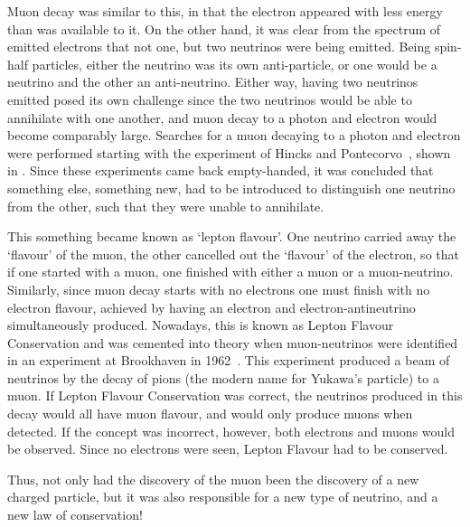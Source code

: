 
Muon decay was similar to this, in that the electron appeared with less energy than was available to it.
On the other hand, it was clear from the spectrum of emitted electrons that not one, but two neutrinos were being emitted.
Being spin-half particles, either the neutrino was its own anti-particle, or one would be a neutrino and the other an anti-neutrino.
Either way, having two neutrinos emitted posed its own challenge since the two neutrinos would be able to annihilate with one another, and muon decay to a photon and electron would become comparably large.
Searches for a muon decaying to a photon and electron were performed starting with the experiment of Hincks and Pontecorvo~\cite{Hincks194802}, shown in .
Since these experiments came back empty-handed, it was concluded that something else, something new, had to be introduced to distinguish one neutrino from the other, such that they were unable to annihilate.

This something became known as 	`lepton flavour'.  
One neutrino carried away the `flavour' of the muon, the other cancelled out the `flavour' of the electron, so that if one started with a muon, one finished with either a muon or a muon-neutrino.
Similarly, since muon decay starts with no electrons one must finish with no electron flavour, achieved by having an electron and electron-antineutrino simultaneously produced.
Nowadays, this is known as Lepton Flavour Conservation and was cemented into theory when muon-neutrinos were identified in an experiment at Brookhaven in 1962~\cite{MuNeutrinoDiscovery}.
This experiment produced a beam of neutrinos by the decay of pions (the modern name for Yukawa's particle) to a muon.
If Lepton Flavour Conservation was correct, the neutrinos produced in this decay would all have muon flavour, and would only produce muons when detected.
If the concept was incorrect, however, both electrons and muons would be observed.
Since no electrons were seen, Lepton Flavour had to be conserved.

Thus, not only had the discovery of the muon been the discovery of a new charged particle, but it was also responsible for a new type of neutrino, and a new law of conservation!

